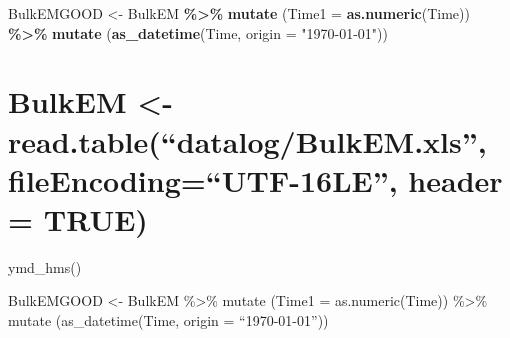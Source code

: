 \documentclass[
]{article}
\newenvironment{Shaded}{\begin{snugshade}}{\end{snugshade}}
\newcommand{\AttributeTok}[1]{\textcolor[rgb]{0.13,0.29,0.53}{#1}}
\newcommand{\FunctionTok}[1]{\textcolor[rgb]{0.13,0.29,0.53}{\textbf{#1}}}
\newcommand{\NormalTok}[1]{#1}
\newcommand{\OtherTok}[1]{\textcolor[rgb]{0.56,0.35,0.01}{#1}}
\newcommand{\SpecialCharTok}[1]{\textcolor[rgb]{0.81,0.36,0.00}{\textbf{#1}}}
\newcommand{\StringTok}[1]{\textcolor[rgb]{0.31,0.60,0.02}{#1}}
\begin{document}
\begin{Shaded}
\begin{Highlighting}[]
\NormalTok{BulkEMGOOD }\OtherTok{\textless{}{-}}\NormalTok{  BulkEM }\SpecialCharTok{\%\textgreater{}\%} 
                \FunctionTok{mutate}\NormalTok{ (}\AttributeTok{Time1 =} \FunctionTok{as.numeric}\NormalTok{(Time)) }\SpecialCharTok{\%\textgreater{}\%} 
                \FunctionTok{mutate}\NormalTok{ (}\FunctionTok{as\_datetime}\NormalTok{(Time, }\AttributeTok{origin =} \StringTok{"1970{-}01{-}01"}\NormalTok{))}
\end{Highlighting}
\end{Shaded}

\hypertarget{section}{%
\section{}\label{section}}

\hypertarget{bulkem---read.tabledatalogbulkem.xls-fileencodingutf-16le-header-true}{%
\section{BulkEM \textless- read.table(``datalog/BulkEM.xls'',
fileEncoding=``UTF-16LE'', header =
TRUE)}\label{bulkem---read.tabledatalogbulkem.xls-fileencodingutf-16le-header-true}}

ymd\_hms()

BulkEMGOOD \textless- BulkEM \%\textgreater\% mutate (Time1 =
as.numeric(Time)) \%\textgreater\% mutate (as\_datetime(Time, origin =
``1970-01-01''))
\end{document}

